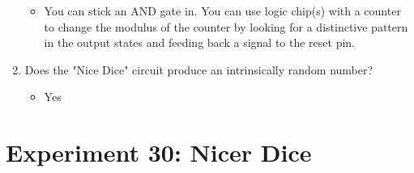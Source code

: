 \documentclass[pstricks,border=11pt]{article}
\begin{document}
\begin{enumerate}
    \begin{itemize}
        \item You can stick an AND gate in. You can use logic chip(s) with a counter to change the modulus of the counter by looking for a distinctive pattern in the output states and feeding back a signal to the reset pin.
    \end{itemize}
    \item Does the "Nice Dice" circuit produce an intrinsically random number?
    \begin{itemize}
        \item Yes
    \end{itemize}
\end{enumerate}


\section{Experiment 30: Nicer Dice}
\end{document}
